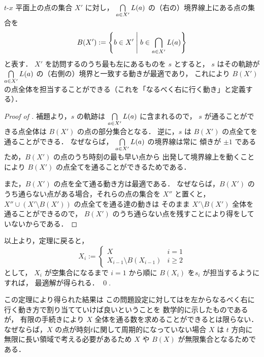 \begin{lemm}
	\label{lemm:xt_decided_3}
	$t$-$x$ 平面上の点の集合 $X'$ に対し，
	$\bigcap\limits_{a \in X'} L(a)$ の（右の）境界線上にある点の集合を
	\[
		B(X') := \left\{{ b \in X'}\;\middle|\;{ b \in \bigcap_{a \in X'} L(a) }\right\}
	\]
	と表す．
	$X'$ を訪問する\server のうち最も左にあるものを $s$ とすると，
	$s$ はその軌跡が $\bigcap\limits_{a \in X'} L(a)$ の（右側の）境界と一致する動きが最適であり，
	これにより $B(X')$ の点全体を担当することができる（これを「なるべく右に行く動き」と定義する）．
\end{lemm}


\begin{proof}[Proof of ]
	補題より，$s$ の軌跡は
	$\bigcap\limits_{a \in X'} L(a)$ に含まれるので，
	$s$ が通ることができる点全体は
	$B(X')$ の点の部分集合となる．
	逆に，$s$ は $B(X')$ の点全てを通ることができる．
	なぜならば， $\bigcap\limits_{a \in X'} L(a)$ の境界線は常に
	傾きが $\pm 1$ であるため，$B(X')$ の点のうち時刻の最も早い点から
	出発して境界線上を動くことにより
	$B(X')$ の点全てを通ることができるためである．

	また，$B(X')$ の点を全て通る動き方は最適である．
	なぜならば，$B(X')$ のうち通らない点がある場合，それらの点の集合を $X''$ と置くと，
	$X'' \cup (X' \setminus B(X'))$ の点全てを通る\server 達の動きは
	そのまま $X' \setminus B(X')$ 全体を通ることができるので，
	$B(X')$ のうち通らない点を残すことにより得をしていないからである．
\end{proof}


以上より，定理に戻ると，
\[
X_i := 
\begin{cases}
	X & i = 1 \\
	X_{i - 1} \setminus B(X_{i - 1}) & i \geq 2
\end{cases}
\]
として，
$X_i$ が空集合になるまで $i = 1$ から順に $B(X_i)$ を\server  $s_i$ が担当するようにすれば，
最適解が得られる．
\qed {}.

この定理により得られた結果は
この問題設定に対しては\server を左からなるべく右に行く動き方で割り当てていけば良いということを
数学的に示したものであるが，
有限の手続きにより $X$ 全体を通る\server 数を求めることができるとは限らない．
なぜならば，$X$ の点が時刻$t$に関して周期的になっていない場合 $X$ は $t$ 方向に
無限に長い領域で考える必要があるため $X$ や $B(X)$ が無限集合となるためである．

